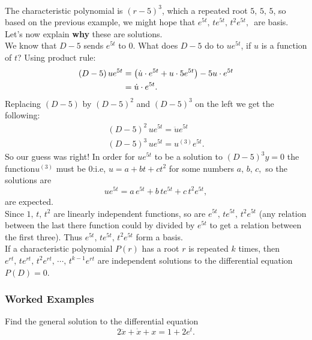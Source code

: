 \Solution \\
The characteristic polynomial is $(r-5)^3$, which a repeated root $5,\, 5,\, 5$,
so based on the previous example, we might hope that $e^{5t},\, te^{5t},\, t^2 e^{5t},\,$
are basis.
Let's now explain \textbf{why} these are solutions. \\
We know that $D - 5$ sends $e^{5t}$ to $0$.
What does $D - 5$ do to $ue^{5t}$, if $u$ is a function of $t$?
Using product rule:
\begin{align*}
  \displaystyle  (D-5) \,  u e^{5t}
  \displaystyle &= \left( \dot{u}\cdot e^{5t} + u \cdot 5 e^{5t} \right) - 5 u \cdot e^{5t} \\
  \displaystyle &= \dot{u} \cdot e^{5t}.
\end{align*}
Replacing $(D-5)$ by $(D-5)^2$ and $(D-5)^3$ on the left we get the following:
\begin{align*}
  \displaystyle  (D-5)^2 \,  u e^{5t}
  \displaystyle = \ddot{u} e^{5t}\\
  \displaystyle (D-5)^3 \,  u e^{5t}
  \displaystyle = u^{(3)} e^{5t}.
\end{align*}
So our guess was right! In order for $ue^{5t}$ to be a solution to
$(D-5)^3y = 0$ the function$u^{(3)}$ must be 0:i.e,
$u = a + bt + ct^2$ for some numbers $a,\, b,\, c,$ so the solutions are
\begin{equation*}
  \displaystyle u e^{5t} = a \,  e^{5t} + b \,  t e^{5t} + c \,  t^2 e^{5t},
\end{equation*}
are expected. \\

Since $1,\, t,\, t^2$ are linearly independent functions, so are $e^{5t},\, te^{5t},\, t^2 e^{5t}$
(any relation between the last there function could by divided by $e^{5t}$ to get a relation
between the first three). Thus $e^{5t},\, te^{5t},\, t^2 e^{5t}$ form a basis. \\

If a characteristic polynomial $P(r)$ has a root $r$ is repeated $k$ times, then
$e^{rt},\, te^{rt},\, t^2 e^{rt},\, \cdots ,\, t^{k-1} e^{rt}$ are independent solutions
to the differential equation $P(D)=0$. 
\clearpage

\subsubsection{Worked Examples}
\begin{example}
  Find the general solution to the differential equation
  \begin{equation*}
    2\ddot{x}+\dot{x}+x=1+2e^{t}.
  \end{equation*}
\end{example}

